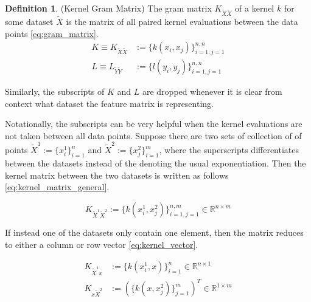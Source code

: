 \documentclass[twoside]{article} \usepackage{aistats2017}
\theoremstyle{definition}
\newtheorem{definition}[theorem]{Definition}
\newcommand{\ds}[1]{\tilde{#1}}
\begin{document}
		\begin{definition}
		\label{def:gram_matrix}
			(Kernel Gram Matrix)
			The gram matrix $K_{\ds{X} \ds{X}}$ of a kernel $k$ for some dataset $\ds{X}$ is the matrix of all paired kernel evaluations between the data points \eqref{eq:gram_matrix}.
			\begin{equation}
			\begin{aligned}
				K \equiv K_{\ds{X} \ds{X}} &:= \{k(x_{i}, x_{j})\}_{i = 1, j = 1}^{n, n} \\
				L \equiv L_{\ds{Y} \ds{Y}} &:= \{l(y_{i}, y_{j})\}_{i = 1, j = 1}^{n, n}
			\label{eq:gram_matrix}
			\end{aligned}
			\end{equation}
			
			Similarly, the subscripts of $K$ and $L$ are dropped whenever it is clear from context what dataset the feature matrix is representing.
			
			Notationally, the subscripts can be very helpful when the kernel evaluations are not taken between all data points. Suppose there are two sets of collection of of points $\ds{X}^{1} := \{x_{i}^{1}\}_{i = 1}^{n}$ and $\ds{X}^{2} := \{x_{j}^{2}\}_{i = 1}^{m}$, where the superscripts differentiates between the datasets instead of the denoting the usual exponentiation. Then the kernel matrix between the two datasets is written as follows \eqref{eq:kernel_matrix_general}.
			
			\begin{equation}
				K_{\ds{X}^{1} \ds{X}^{2}} := \{k(x_{i}^{1}, x_{j}^{2})\}_{i = 1, j = 1}^{n, m} \in \mathbb{R}^{n \times m}
			\label{eq:kernel_matrix_general}
			\end{equation}
			
			If instead one of the datasets only contain one element, then the matrix reduces to either a column or row vector \eqref{eq:kernel_vector}.
	
			\begin{equation}
			\begin{aligned}
				K_{\ds{X}^{1} x} &:= \{k(x_{i}^{1}, x)\}_{i = 1}^{n} \in \mathbb{R}^{n \times 1} \\
				K_{x \ds{X}^{2}} &:= (\{k(x, x_{j}^{2})\}_{j = 1}^{m})^{T} \in \mathbb{R}^{1 \times m}
			\label{eq:kernel_vector}
			\end{aligned}
			\end{equation}
		\end{definition}
			
\end{document}
